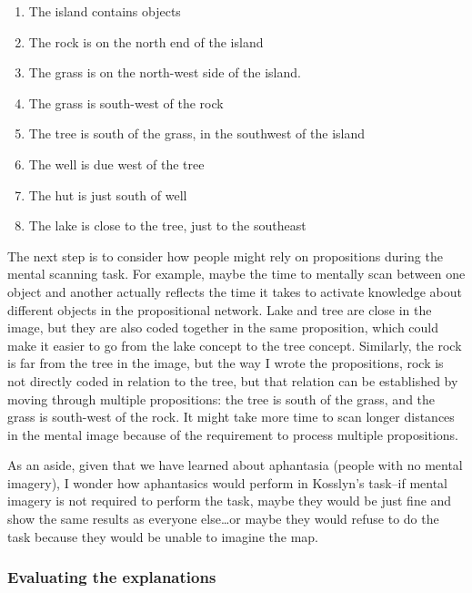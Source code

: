 \documentclass[
  oneside,
  12pt]{crumpbook}
\providecommand{\tightlist}{%
  \setlength{\itemsep}{0pt}\setlength{\parskip}{0pt}}
\begin{document}
\begin{enumerate}
\def\labelenumi{\arabic{enumi}.}
\tightlist
\item
  The island contains objects
\item
  The rock is on the north end of the island
\item
  The grass is on the north-west side of the island.
\item
  The grass is south-west of the rock
\item
  The tree is south of the grass, in the southwest of the island
\item
  The well is due west of the tree
\item
  The hut is just south of well
\item
  The lake is close to the tree, just to the southeast
\end{enumerate}

The next step is to consider how people might rely on propositions during the mental scanning task. For example, maybe the time to mentally scan between one object and another actually reflects the time it takes to activate knowledge about different objects in the propositional network. Lake and tree are close in the image, but they are also coded together in the same proposition, which could make it easier to go from the lake concept to the tree concept. Similarly, the rock is far from the tree in the image, but the way I wrote the propositions, rock is not directly coded in relation to the tree, but that relation can be established by moving through multiple propositions: the tree is south of the grass, and the grass is south-west of the rock. It might take more time to scan longer distances in the mental image because of the requirement to process multiple propositions.

As an aside, given that we have learned about aphantasia (people with no mental imagery), I wonder how aphantasics would perform in Kosslyn's task--if mental imagery is not required to perform the task, maybe they would be just fine and show the same results as everyone else\ldots or maybe they would refuse to do the task because they would be unable to imagine the map.

\hypertarget{evaluating-the-explanations}{%
\subsubsection{Evaluating the explanations}\label{evaluating-the-explanations}}
\end{document}
